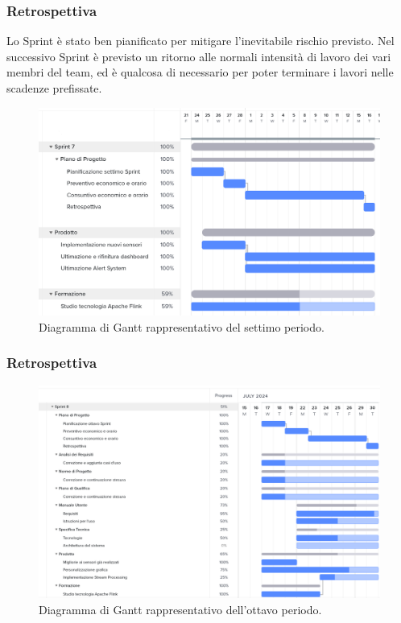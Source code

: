 \documentclass[8pt]{article}
\begin{document}
\subsubsection{Retrospettiva}
Lo Sprint è stato ben pianificato per mitigare l'inevitabile rischio previsto. Nel successivo Sprint è previsto un ritorno alle normali intensità di lavoro dei vari membri del team, ed è qualcosa di necessario per poter terminare i lavori nelle scadenze prefissate.
\begin{figure}[h!]
    \centering
    \includegraphics[width=13cm]{./images_pdp/gantt7.png}
    \caption{Diagramma di Gantt rappresentativo del settimo periodo.}
\end{figure}
\clearpage

\subsubsection{Retrospettiva}

\begin{figure}[h!]
    \centering
    \includegraphics[width=13cm]{./images_pdp/gantt8.png}
    \caption{Diagramma di Gantt rappresentativo dell'ottavo periodo.}
\end{figure}
\clearpage
\newpage
\end{document}
